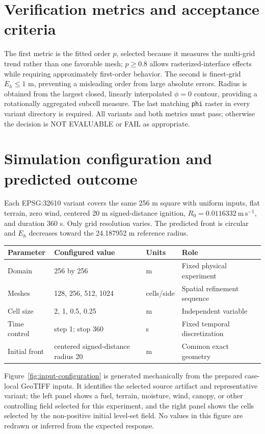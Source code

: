 \section{Verification metrics and acceptance criteria}

The first metric is the fitted order \(p\), selected because it measures the multi-grid trend rather than one favorable mesh; \(p\ge0.8\) allows rasterized-interface effects while requiring approximately first-order behavior. The second is finest-grid \(E_h\le1\) m, preventing a misleading order from large absolute errors. Radius is obtained from the largest closed, linearly interpolated \(\phi=0\) contour, providing a rotationally aggregated subcell measure. The last matching \texttt{phi} raster in every variant directory is required. All variants and both metrics must pass; otherwise the decision is NOT EVALUABLE or FAIL as appropriate.

\section{Simulation configuration and predicted outcome}

Each EPSG:32610 variant covers the same 256 m square with uniform inputs, flat terrain, zero wind, centered 20 m signed-distance ignition, \(R_0=0.0116332~\mathrm{m\,s^{-1}}\), and duration 360 s. Only grid resolution varies. The predicted front is circular and \(E_h\) decreases toward the 24.187952 m reference radius.

\begin{center}\begin{tabular}{p{}p{}p{}p{}}\toprule
Parameter & Configured value & Units & Role \\
\midrule Domain & 256 by 256 & m & Fixed physical experiment \\
Meshes & 128, 256, 512, 1024 & cells/side & Spatial refinement sequence \\
Cell size & 2, 1, 0.5, 0.25 & m & Independent variable \\
Time control & step 1; stop 360 & s & Fixed temporal discretization \\
Initial front & centered signed-distance radius 20 & m & Common exact geometry \\
\bottomrule\end{tabular}\end{center}

Figure~\ref{fig:input-configuration} is generated mechanically from the prepared case-local GeoTIFF inputs. It identifies the selected source artifact and representative variant; the left panel shows a fuel, terrain, moisture, wind, canopy, or other controlling field selected for this experiment, and the right panel shows the cells selected by the non-positive initial level-set field. No values in this figure are redrawn or inferred from the expected response.

